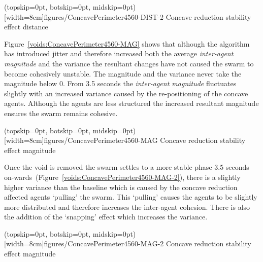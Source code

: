 \documentclass{ieeeaccess}
\begin{document}
\Figure[t!](topskip=0pt, botskip=0pt, midskip=0pt)[width=8cm]{figures/ConcavePerimeter4560-DIST-2}
{Concave reduction stability effect distance\label{voids:ConcavePerimeter4560-DIST-2}}


Figure~\ref{voids:ConcavePerimeter4560-MAG} shows that although the algorithm has introduced jitter and therefore increased both the average \textit{inter-agent magnitude} and the variance the resultant changes have not caused the swarm to become cohesively unstable. The magnitude and the variance never take the magnitude below 0. From 3.5 seconds the \textit{inter-agent magnitude} fluctuates slightly with an increased variance caused by the re-positioning of the concave agents. Although the agents are less structured the increased resultant magnitude ensures the swarm remains cohesive. 

\Figure[t!](topskip=0pt, botskip=0pt, midskip=0pt)[width=8cm]{figures/ConcavePerimeter4560-MAG}
{Concave reduction stability effect magnitude\label{voids:ConcavePerimeter4560-MAG}}


Once the void is removed the swarm settles to a more stable phase 3.5 seconds on-wards~(Figure~\ref{voids:ConcavePerimeter4560-MAG-2}), there is a slightly higher variance than the baseline which is caused by the concave reduction affected agents `pulling' the swarm. This `pulling' causes the agents to be slightly more distributed and therefore increases the inter-agent cohesion. There is also the addition of the `snapping' effect which increases the variance. 

\Figure[t!](topskip=0pt, botskip=0pt, midskip=0pt)[width=8cm]{figures/ConcavePerimeter4560-MAG-2}
{Concave reduction stability effect magnitude\label{voids:ConcavePerimeter4560-MAG-2}}
\end{document}
